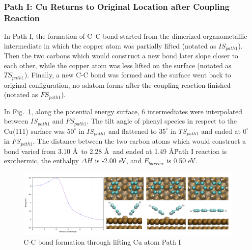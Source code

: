 \documentclass[%
 reprint,
 amsmath,amssymb,
 aps,
prb,
]{revtex4-2}
\begin{document}
\subsubsection{Path I: Cu Returns to Original Location after Coupling Reaction}

In Path I, the formation of C--C bond started from the dimerized organometallic intermediate in which the copper atom was partially lifted (notated as $IS_{path1}$). Then the two carbons which would construct a new bond later slope closer to each other, while the copper atom was less lifted on the surface (notated as $TS_{path1}$). Finally, a new C-C bond was formed and the surface went back to original configuration, no adatom forms after the coupling reaction finished (notated as $FS_{path1}$).

In Fig.~\ref{fig:bondformlift}, along the potential energy surface, 6 intermediates were interpolated between $IS_{path1}$ and $FS_{path1}$. The tilt angle of phenyl species in respect to the Cu(111) surface was $50^\circ$ in $IS_{path1}$ and flattened to $35^\circ$ in $TS_{path1}$ and ended at $0^\circ$ in $FS_{path1}$. The distance between the two carbon atoms which would construct a bond varied from 3.10 \AA\ to 2.28 \AA\ and ended at 1.49 \AA\.

Path I reaction is exothermic, the enthalpy $\Delta H$ is -2.00 eV, and $E_{barrier}$ is 0.50 eV.

\begin{figure}[hbt]
\centering
\includegraphics[width=1.0\textwidth]{Fig/bondformlift.png}
\caption{C-C bond formation through lifting Cu atom Path I}
\label{fig:bondformlift}
\end{figure}
\end{document}
